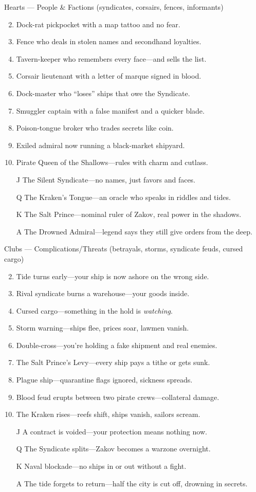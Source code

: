 Hearts --- People \& Factions (syndicates, corsairs, fences, informants)
\begin{enumerate}
\setcounter{enumi}{1}
\item Dock-rat pickpocket with a map tattoo and no fear.
\item Fence who deals in stolen names and secondhand loyalties.
\item Tavern-keeper who remembers every face---and sells the list.
\item Corsair lieutenant with a letter of marque signed in blood.
\item Dock-master who ``loses'' ships that owe the Syndicate.
\item Smuggler captain with a false manifest and a quicker blade.
\item Poison-tongue broker who trades secrets like coin.
\item Exiled admiral now running a black-market shipyard.
\item Pirate Queen of the Shallows---rules with charm and cutlass.
\item[J] The Silent Syndicate---no names, just favors and faces.
\item[Q] The Kraken's Tongue---an oracle who speaks in riddles and tides.
\item[K] The Salt Prince---nominal ruler of Zakov, real power in the shadows.
\item[A] The Drowned Admiral---legend says they still give orders from the deep.
\end{enumerate}

Clubs --- Complications/Threats (betrayals, storms, syndicate feuds, cursed cargo)
\begin{enumerate}
\setcounter{enumi}{1}
\item Tide turns early---your ship is now ashore on the wrong side.
\item Rival syndicate burns a warehouse---your goods inside.
\item Cursed cargo---something in the hold is \textit{watching}.
\item Storm warning---ships flee, prices soar, lawmen vanish.
\item Double-cross---you're holding a fake shipment and real enemies.
\item The Salt Prince's Levy---every ship pays a tithe or gets sunk.
\item Plague ship---quarantine flags ignored, sickness spreads.
\item Blood feud erupts between two pirate crews---collateral damage.
\item The Kraken rises---reefs shift, ships vanish, sailors scream.
\item[J] A contract is voided---your protection means nothing now.
\item[Q] The Syndicate splits---Zakov becomes a warzone overnight.
\item[K] Naval blockade---no ships in or out without a fight.
\item[A] The tide forgets to return---half the city is cut off, drowning in secrets.
\end{enumerate}

